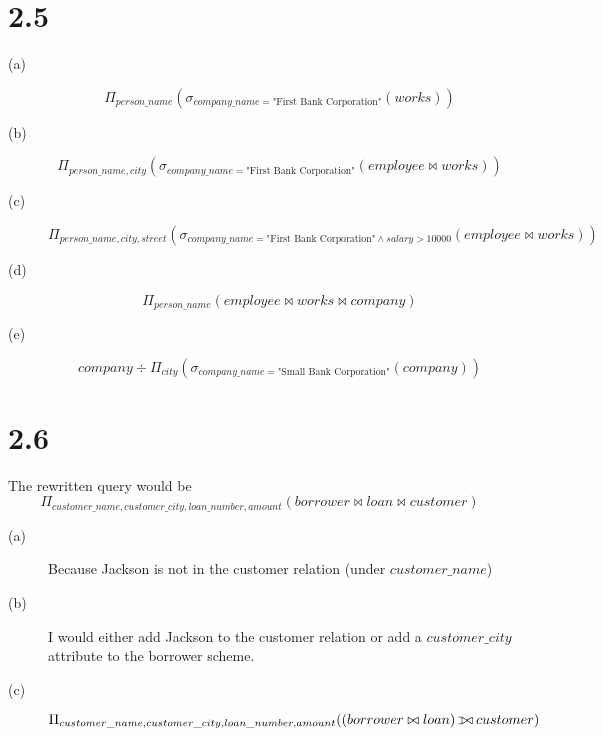 \documentclass{article}
\def\ojoin{\setbox0=\hbox{$\bowtie$}%
    \rule[-.02ex]{.25em}{.4pt}\llap{\rule[\ht0]{.25em}{.4pt}}}
\def\leftouterjoin{\mathbin{\ojoin\mkern-5.8mu\bowtie}}
\begin{document}
\section*{2.5}
\begin{description}
    \item[(a)]
        \[ \Pi_{person\_name}(\sigma_{company\_name=\text{"First Bank
                    Corporation"}} (works)) \]
    \item[(b)]
        \[ \Pi_{person\_name, city}(\sigma_{company\_name=\text{"First Bank
                    Corporation"}} (employee \bowtie works)) \]
    \item[(c)]
        \[ \Pi_{person\_name, city, street} (\sigma_{company\_name=
                \text{"First Bank Corporation"} \wedge salary > 10000}
            (employee \bowtie works)) \]
    \item[(d)]
        \[ \Pi_{person\_name}(employee \bowtie works \bowtie company) \]
    \item[(e)]
        \[ company \div \Pi_{city}(\sigma_{company\_name=\text{"Small Bank
                    Corporation"}}(company)) \]
\end{description}
\section*{2.6}
The rewritten query would be
\[ \Pi_{customer\_name, customer\_city, loan\_number, amount}(borrower \bowtie
    loan \bowtie customer) \]
\begin{description}
    \item[(a)]
        Because Jackson is not in the customer relation (under $customer\_name$)
    \item[(b)]
        I would either add Jackson to the customer relation or add a
        $customer\_city$ attribute to the borrower scheme.
    \item[(c)]
        \[ \Pi_{customer\_name, customer\_city, loan\_number, amount}(
            (borrower \bowtie loan) \leftouterjoin customer) \]
\end{description}
\end{document}
